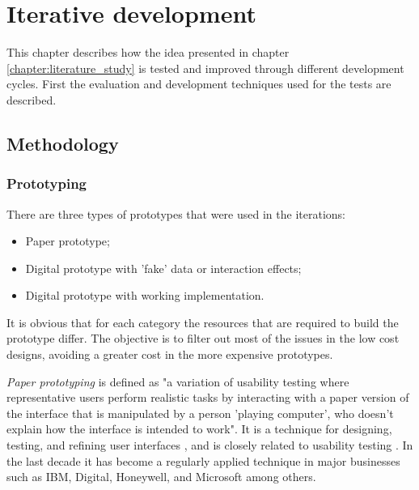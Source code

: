 \chapter{Iterative development}\label{chapter:prototype}


This chapter describes how the idea presented in chapter \ref{chapter:literature_study} is tested and improved through different development cycles. First the evaluation and development techniques used for the tests are described.


\section{Methodology}\label{chapter:prototype:section:methodology}

\subsection{Prototyping}\label{chapter:prototype:section:methodology:subsection:development}


There are three types of prototypes that were used in the iterations:

\begin{itemize}
	\item Paper prototype;
	\item Digital prototype with 'fake' data or interaction effects;
	\item Digital prototype with working implementation.
\end{itemize}

It is obvious that for each category the resources that are required to build the prototype differ. The objective is to filter out most of the issues in the low cost designs, avoiding a greater cost in the more expensive prototypes.


\emph{Paper prototyping} is defined as "a variation of usability testing where representative users perform realistic tasks by interacting with a paper version of the interface that is manipulated by a person 'playing computer', who doesn’t explain how the interface is intended to work"\cite{snyder:2003:web}. It is a technique for designing, testing, and refining user interfaces \cite{snyder:2003}, and is closely related to usability testing \cite{snyder:2003:web}. In the last decade it has become a regularly applied technique in major businesses such as IBM, Digital, Honeywell, and Microsoft among others\cite{snyder:2003}.

